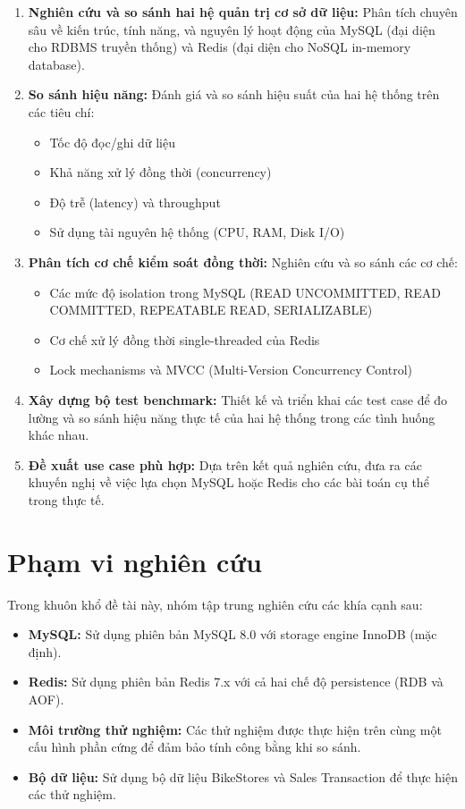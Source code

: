 \begin{enumerate}
    \item \textbf{Nghiên cứu và so sánh hai hệ quản trị cơ sở dữ liệu:} Phân tích chuyên sâu về kiến trúc, tính năng, và nguyên lý hoạt động của MySQL (đại diện cho RDBMS truyền thống) và Redis (đại diện cho NoSQL in-memory database).
    
    \item \textbf{So sánh hiệu năng:} Đánh giá và so sánh hiệu suất của hai hệ thống trên các tiêu chí:
    \begin{itemize}
        \item Tốc độ đọc/ghi dữ liệu
        \item Khả năng xử lý đồng thời (concurrency)
        \item Độ trễ (latency) và throughput
        \item Sử dụng tài nguyên hệ thống (CPU, RAM, Disk I/O)
    \end{itemize}
    
    \item \textbf{Phân tích cơ chế kiểm soát đồng thời:} Nghiên cứu và so sánh các cơ chế:
    \begin{itemize}
        \item Các mức độ isolation trong MySQL (READ UNCOMMITTED, READ COMMITTED, REPEATABLE READ, SERIALIZABLE)
        \item Cơ chế xử lý đồng thời single-threaded của Redis
        \item Lock mechanisms và MVCC (Multi-Version Concurrency Control)
    \end{itemize}
    
    
    \item \textbf{Xây dựng bộ test benchmark:} Thiết kế và triển khai các test case để đo lường và so sánh hiệu năng thực tế của hai hệ thống trong các tình huống khác nhau.
    
    \item \textbf{Đề xuất use case phù hợp:} Dựa trên kết quả nghiên cứu, đưa ra các khuyến nghị về việc lựa chọn MySQL hoặc Redis cho các bài toán cụ thể trong thực tế.
\end{enumerate}

\section{Phạm vi nghiên cứu}

Trong khuôn khổ đề tài này, nhóm tập trung nghiên cứu các khía cạnh sau:

\begin{itemize}
    \item \textbf{MySQL:} Sử dụng phiên bản MySQL 8.0 với storage engine InnoDB (mặc định).
    \item \textbf{Redis:} Sử dụng phiên bản Redis 7.x với cả hai chế độ persistence (RDB và AOF).
    \item \textbf{Môi trường thử nghiệm:} Các thử nghiệm được thực hiện trên cùng một cấu hình phần cứng để đảm bảo tính công bằng khi so sánh.
    \item \textbf{Bộ dữ liệu:} Sử dụng bộ dữ liệu BikeStores và Sales Transaction để thực hiện các thử nghiệm.
\end{itemize}

